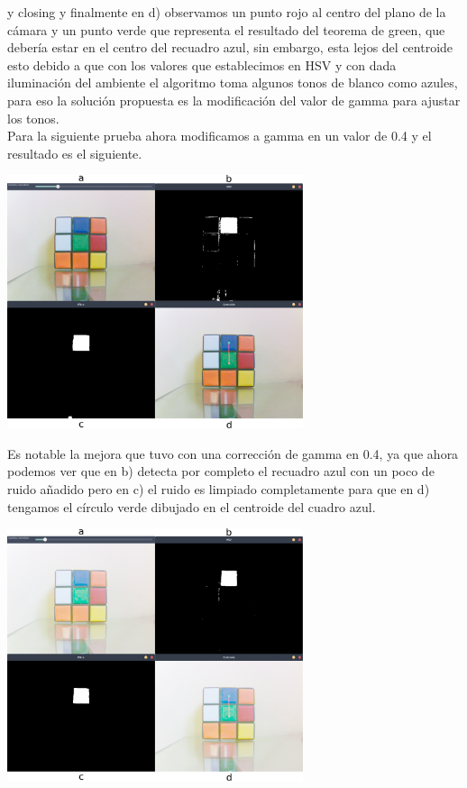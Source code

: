y closing y finalmente en d) observamos un punto rojo al centro del plano de la cámara y un punto verde que representa el resultado
del teorema de green, que debería estar en el centro del recuadro azul, sin embargo, esta lejos del centroide esto debido a que con
los valores que establecimos en HSV y con dada iluminación del ambiente el algoritmo toma algunos tonos de blanco como azules,
para eso la solución propuesta es la modificación del valor de gamma para ajustar los tonos.\\
Para la siguiente prueba ahora modificamos a gamma en un valor de 0.4 y el resultado es el siguiente.
\begin{center}
	\includegraphics[width=0.65\textwidth]{Contenido/Cuerpo/Capitulo4/Fig26.eps}
	\label{Fig9}
\end{center}
Es notable la mejora que tuvo con una corrección de gamma en 0.4, ya que ahora podemos ver que en b) detecta por completo el
recuadro azul con un poco de ruido añadido pero en c) el ruido es limpiado completamente para que en d) tengamos el círculo verde
dibujado en el centroide del cuadro azul.
\begin{center}
	\includegraphics[width=0.65\textwidth]{Contenido/Cuerpo/Capitulo4/Fig27.eps}
	\label{Fig9}
\end{center}
